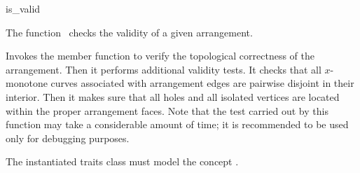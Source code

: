 \ccRefPageBegin

\begin{ccRefFunction}{is_valid}

\ccDefinition

The function \ccRefName\ checks the validity of a given arrangement.



Invokes the member function  to verify the
topological correctness of the arrangement. Then it performs additional
validity tests. It checks that all $x$-monotone curves associated with
arrangement edges are pairwise disjoint in their interior. Then it makes
sure that all holes and all isolated vertices are located within the
proper arrangement faces. Note that the test carried out by this
function may take a considerable amount of time; it is recommended to be
used only for debugging purposes.

The instantiated traits class must model the concept
. 

\end{ccRefFunction}

\ccRefPageEnd
